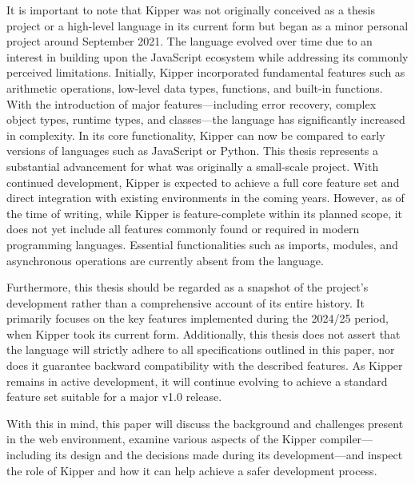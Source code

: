 It is important to note that Kipper was not originally conceived as a thesis project or a high-level language in its current form but began as a minor personal project around September 2021. The language evolved over time due to an interest in building upon the JavaScript ecosystem while addressing its commonly perceived limitations. Initially, Kipper incorporated fundamental features such as arithmetic operations, low-level data types, functions, and built-in functions. With the introduction of major features—including error recovery, complex object types, runtime types, and classes—the language has significantly increased in complexity. In its core functionality, Kipper can now be compared to early versions of languages such as JavaScript or Python. This thesis represents a substantial advancement for what was originally a small-scale project. With continued development, Kipper is expected to achieve a full core feature set and direct integration with existing environments in the coming years. However, as of the time of writing, while Kipper is feature-complete within its planned scope, it does not yet include all features commonly found or required in modern programming languages. Essential functionalities such as imports, modules, and asynchronous operations are currently absent from the language.

Furthermore, this thesis should be regarded as a snapshot of the project's development rather than a comprehensive account of its entire history. It primarily focuses on the key features implemented during the 2024/25 period, when Kipper took its current form. Additionally, this thesis does not assert that the language will strictly adhere to all specifications outlined in this paper, nor does it guarantee backward compatibility with the described features. As Kipper remains in active development, it will continue evolving to achieve a standard feature set suitable for a major v1.0 release.

With this in mind, this paper will discuss the background and challenges present in the web environment, examine various aspects of the Kipper compiler—including its design and the decisions made during its development—and inspect the role of Kipper and how it can help achieve a safer development process.

